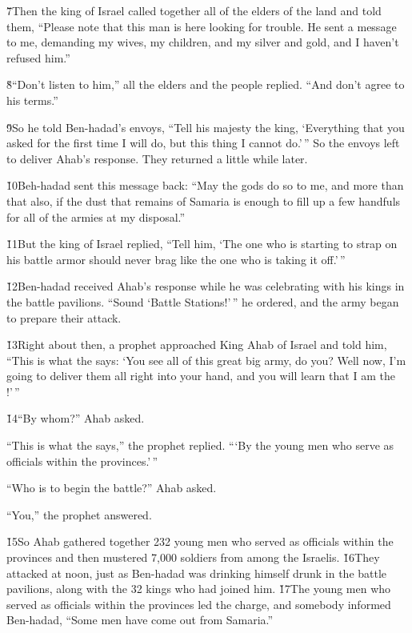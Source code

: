 \v{7}Then the king of Israel called together all of the elders of the land and told them, ``Please note that this man is here looking for trouble. He sent a message to me, demanding my wives, my children, and my silver and gold, and I haven't refused him.''

\v{8}``Don't listen to him,'' all the elders and the people replied. ``And don't agree to his terms.''

\v{9}So he told Ben-hadad's envoys, ``Tell his majesty the king, `Everything that you asked for the first time I will do, but this thing I cannot do.'\,'' So the envoys left to deliver Ahab's response. They returned a little while later.

\v{10}Beh-hadad sent this message back: ``May the gods do so to me, and more than that also, if the dust that remains of Samaria is enough to fill up a few handfuls for all of the armies at my disposal.''

\v{11}But the king of Israel replied, ``Tell him, `The one who is starting to strap on his battle armor should never brag like the one who is taking it off.'\,''

\v{12}Ben-hadad received Ahab's response while he was celebrating with his kings in the battle pavilions. ``Sound `Battle Stations!'\,'' he ordered, and the army began to prepare their attack.

\v{13}Right about then, a prophet approached King Ahab of Israel and told him, ``This is what the  says: `You see all of this great big army, do you? Well now, I'm going to deliver them all right into your hand, and you will learn that I am the !'\,''

\v{14}``By whom?'' Ahab asked.

``This is what the  says,'' the prophet replied. ```By the young men who serve as officials within the provinces.'\,''

``Who is to begin the battle?'' Ahab asked.

``You,'' the prophet answered.

\v{15}So Ahab gathered together 232 young men who served as officials within the provinces and then mustered 7,000 soldiers from among the Israelis. \v{16}They attacked at noon, just as Ben-hadad was drinking himself drunk in the battle pavilions, along with the 32 kings who had joined him. \v{17}The young men who served as officials within the provinces led the charge, and somebody informed Ben-hadad, ``Some men have come out from Samaria.''

